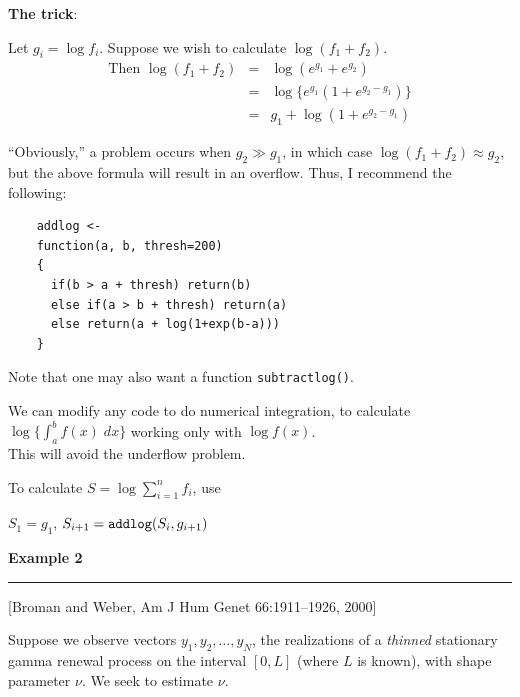 \documentclass[12pt,letterpaper]{article}
\newcommand{\HRule}{\rule{\linewidth}{4pt}}
\newcommand{\hspone}{\hspace*{1cm}}
\newcommand{\vsphalf}{\vspace*{0.5cm}}
\begin{document}
\vsphalf

\fontsize{20}{25} \selectfont

\textbf{The trick}:

\bigskip

Let $g_i = \log f_i$. Suppose we wish to calculate $\log(f_1 +
f_2)$.
\begin{eqnarray*}
\text{Then } \log(f_1 + f_2) & = & \log(e^{g_1} + e^{g_2}) \\
& = & \log\{ e^{g_1} ( 1 + e^{g_2 - g_1}) \} \\
& = & g_1 + \log(1 + e^{g_2 - g_1})
\end{eqnarray*}

\bigskip

``Obviously,'' a problem occurs when $g_2 \gg g_1$, in which case
$\log(f_1 + f_2) \approx g_2$, but the above formula will result in an
overflow.  Thus, I recommend the following:

\fontsize{20}{20}

\begin{verbatim}
    addlog <-
    function(a, b, thresh=200)
    {
      if(b > a + thresh) return(b)
      else if(a > b + thresh) return(a)
      else return(a + log(1+exp(b-a)))
    }
\end{verbatim}

\fontsize{20}{25}

Note that one may also want a function \verb|subtractlog()|.

\bigskip

We can modify any code to do numerical integration, to calculate
$\log\{\int_a^b f(x) \; dx\}$ working only with $\log f(x)$.  \\ This
will avoid the underflow problem.

\bigskip

To calculate $S = \log \sum_{i=1}^n f_i$, use

\hspone $S_1 = g_1$, $S_{i+1} = \verb|addlog|(S_i, g_{i+1})$

\newpage

\fontsize{30}{30} \selectfont

\centerline{\textbf{Example 2}}

\HRule

\vsphalf

\fontsize{20}{25} \selectfont

[Broman and Weber, Am J Hum Genet 66:1911--1926, 2000]

\bigskip

Suppose we observe vectors $y_1, y_2, \ldots, y_N$, the realizations
of a \emph{thinned} stationary gamma renewal process on the interval
$[0, L]$ (where $L$ is known), with shape parameter $\nu$.  We seek to
estimate $\nu$.
\end{document}
